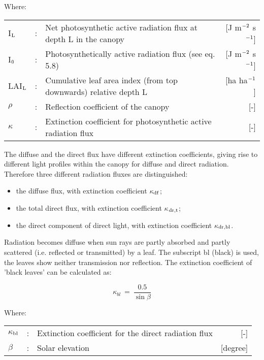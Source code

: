 Where:\\
\begin{tabularx}{\textwidth}{llXr}
I$_{{\rm L}}$   &:& Net photosynthetic active radiation flux at 
    depth L in the canopy    &    [J m$^{{\rm -2}}$ s$^{{\rm -1}}$]\\
I$_{{\rm 0}}$   &:& Photosynthetically active radia\-tion flux (see eq. 5.8)  & 
     [J m$^{{\rm -2}}$ s$^{{\rm -1}}$]\\
LAI$_{{\rm L}}$ &:& Cumulative leaf area index (from top downwards) 
    relative depth L & [ha ha$^{{\rm -1}}$]\\
$\rho$          &:& Reflection coefficient of the canopy   &     [-]\\
$\kappa$        &:& Extinction coefficient for photosynthetic active 
    radiation flux   &     [-]\\
\end{tabularx}


The diffuse and the direct flux have different extinction coefficients, giving rise to
different light profiles within the canopy for diffuse and direct radiation. Therefore three
different radiation fluxes are distinguished:
\begin{itemize}
\item the diffuse flux, with extinction coefficient $\kappa$$_{{\rm df}}$;
\item the total direct flux, with extinction coefficient $\kappa$$_{{\rm dr,t}}$;\
\item the direct component of direct light, with extinction coefficient $\kappa$$_{{\rm dr,bl}}$.
\end{itemize}

Radiation becomes diffuse when sun rays are partly absorbed and partly scattered (i.e.
reflected or transmitted) by a leaf. The subscript bl (black) is used, the leaves show
neither transmis\-sion nor reflection. The extinction coefficient of 'black leaves'
can be calculat\-ed as:

\begin{equation}
\kappa _{bl} ~=~{\frac{0.5}{\sin \beta }}
\end{equation}

Where:\\
\begin{tabularx}{\textwidth}{llXr}
$\kappa$$_{{\rm bl}}$ &:& Extinction coefficient for the direct radiation flux   &     [-]\\
$\beta$ &:& Solar elevation    &    [degree]\\
\end{tabularx}

